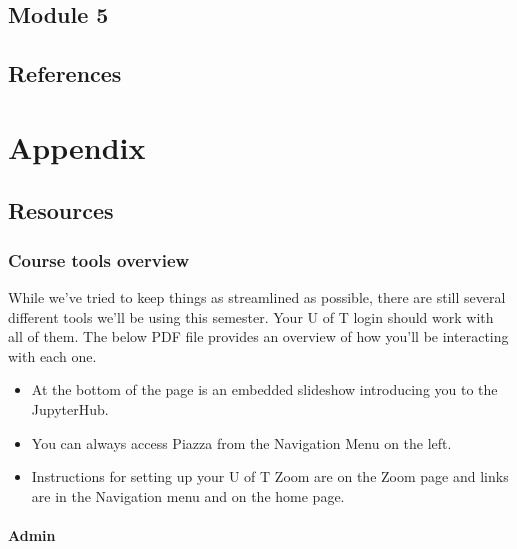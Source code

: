 \documentclass[
  openany]{book}
\providecommand{\tightlist}{%
  \setlength{\itemsep}{0pt}\setlength{\parskip}{0pt}}
\begin{document}
\hypertarget{module-5}{%
\chapter{Module 5}\label{module-5}}

\hypertarget{references-1}{%
\chapter*{References}\label{references-1}}

\hypertarget{part-appendix}{%
\part*{Appendix}\label{part-appendix}}

\hypertarget{resources}{%
\chapter{Resources}\label{resources}}

\hypertarget{course-tools-overview}{%
\section{Course tools overview}\label{course-tools-overview}}

While we've tried to keep things as streamlined as possible, there are still several different tools we'll be using this semester. Your U of T login should work with all of them. The below PDF file provides an overview of how you'll be interacting with each one.

\begin{itemize}
\tightlist
\item
  At the bottom of the page is an embedded slideshow introducing you to the JupyterHub.\\
\item
  You can always access Piazza from the Navigation Menu on the left.\\
\item
  Instructions for setting up your U of T Zoom are on the Zoom page and links are in the Navigation menu and on the home page.
\end{itemize}

\hypertarget{admin}{%
\subsection{Admin}\label{admin}}
\end{document}
